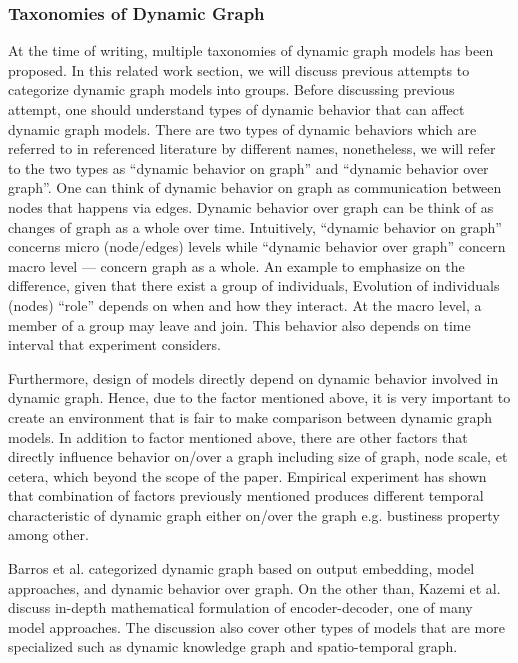 \documentclass{IEEEtran}
\begin{document}
\subsubsection{Taxonomies of Dynamic Graph}
\label{taxonomies of dynamic graph}
At the time of writing, multiple taxonomies of dynamic graph models has been proposed. In this related work section, we will discuss previous attempts to categorize dynamic graph models into groups. Before discussing previous attempt, one should understand types of dynamic behavior that can affect dynamic graph models. There are two types of dynamic behaviors which are referred to in referenced literature by different names, nonetheless, we will refer to the two types as ``dynamic behavior on graph'' and ``dynamic behavior over graph''. One can think of dynamic behavior on graph as communication between nodes that happens via edges. Dynamic  behavior over graph can be think of as changes of graph as a whole over time. Intuitively, ``dynamic behavior on graph'' concerns micro (node/edges) levels while ``dynamic behavior over graph'' concern macro level --- concern graph as a whole. An example to emphasize on the difference, given that there exist a group of individuals, Evolution of individuals (nodes) ``role'' depends on when and how they interact. At the macro level, a member of a group may leave and join. This behavior also depends on time interval that experiment considers.

Furthermore, design of models directly depend on dynamic behavior involved in dynamic graph. Hence, due to the factor mentioned above, it is very important to create an environment that is fair to make comparison between dynamic graph models. In addition to factor mentioned above, there are other factors that directly influence behavior on/over a graph including size of graph, node scale, et cetera, which beyond the scope of the paper. Empirical experiment has shown that combination of factors previously mentioned produces different temporal characteristic of dynamic graph either on/over the graph e.g. bustiness property \cite{holme2012temporal} among other.

Barros et al. \cite{barrosSurveyEmbeddingDynamic2021} categorized dynamic graph based on output embedding, model approaches, and dynamic behavior over graph. On the other than, Kazemi et al. \cite{kazemiRepresentationLearningDynamica} discuss in-depth mathematical formulation of encoder-decoder, one of many model approaches. The discussion also cover other types of models that are more specialized such as dynamic knowledge graph and spatio-temporal graph.
\end{document}
